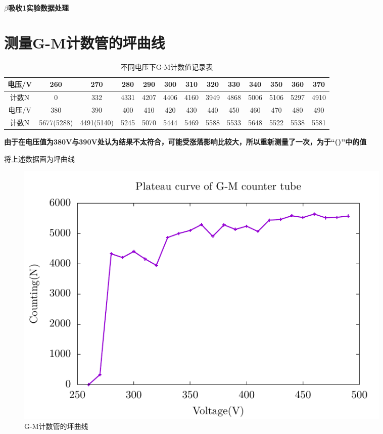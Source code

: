 \documentclass[a4paper,UTF8]{ctexart}
\begin{document}
\begin{center}
    \textbf{\Large $\beta$吸收1实验数据处理}
    \par {}
\end{center}

\section{测量G-M计数管的坪曲线}

\begin{table}[H]
    \centering
    \begin{tabular}{|c|c|c|c|c|c|c|c|c|c|c|c|c|}
    \hline
        电压/V & 260 & 270 & 280 & 290 & 300 & 310 & 320 & 330 & 340 & 350 & 360 & 370 \\ \hline
        计数N & 0 & 332 & 4331 & 4207 & 4406 & 4160 & 3949 & 4868 & 5006 & 5106 & 5297 & 4910 \\ \hline
        电压/V & 380 & 390 & 400 & 410 & 420 & 430 & 440 & 450 & 460 & 470 & 480 & 490 \\ \hline
        计数N & 5677(5288) & 4491(5140) & 5245 & 5070 & 5444 & 5469 & 5588 & 5533 & 5648 & 5522 & 5538 & 5581 \\ \hline
    \end{tabular}
    \caption{不同电压下G-M计数值记录表}
\end{table}

{\bfseries{\color{red}{注：}}由于在电压值为380V与390V处认为结果不太符合，可能受涨落影响比较大，所以重新测量了一次，为于“()”中的值}

将上述数据画为坪曲线

\begin{figure}[H]
    \centering
    \begin{minipage}[b]{0.9\textwidth}
        \centering
        \includegraphics[width=0.9\textwidth]{./fig1.pdf}
        \caption{G-M计数管的坪曲线}
    \end{minipage}
\end{figure}
\end{document}
